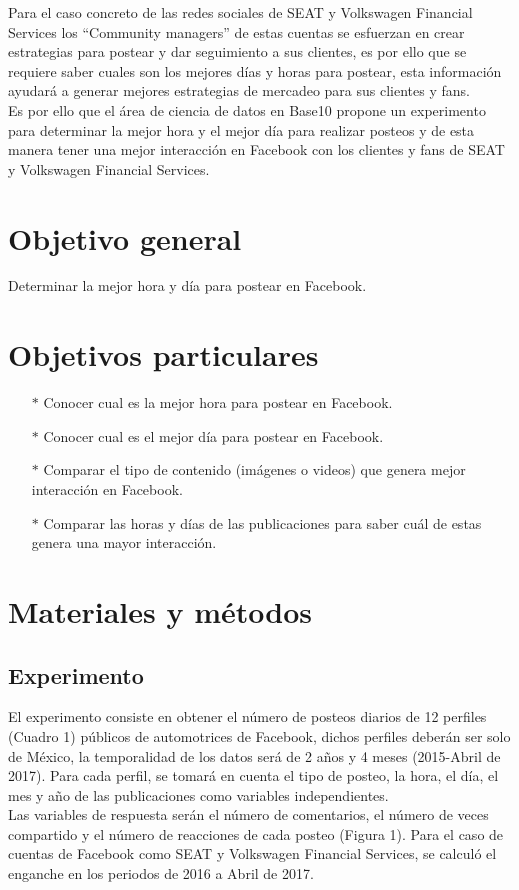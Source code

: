 \documentclass[a4paper,10pt]{article}
\begin{document}
Para el caso concreto de las redes sociales de SEAT y Volkswagen Financial Services
los ``Community managers'' de estas cuentas se esfuerzan en crear estrategias para postear y dar seguimiento a sus clientes,
es por ello que se requiere saber cuales son los mejores días y horas para postear, esta información ayudará a generar mejores estrategias
de mercadeo para sus clientes y fans.\\


Es por ello que el área de ciencia de datos en Base10 propone un experimento
para determinar la mejor hora y el mejor día para realizar posteos y de esta manera
tener una mejor interacción en Facebook con los clientes y fans de SEAT y Volkswagen Financial Services.


\section{Objetivo general}
Determinar la mejor hora y día para postear en Facebook.

\section{Objetivos particulares}
  \begin{itemize}
   \item[$*$] Conocer cual es la  mejor hora para postear en Facebook.
   \item[$*$] Conocer cual es el mejor día para postear en Facebook.
   \item[$*$] Comparar el tipo de contenido (imágenes o videos) que genera mejor interacción en Facebook.
   \item[$*$] Comparar las horas y días de las publicaciones para saber cuál de estas genera una  mayor interacción.
  \end{itemize}


\section{Materiales y métodos}
\subsection{Experimento}
El experimento consiste en obtener el número de posteos diarios de 12 perfiles (Cuadro 1)
públicos de automotrices de Facebook, dichos perfiles deberán ser solo de México, 
la temporalidad de los datos será de  2 años y 4 meses (2015-Abril de 2017).
Para cada perfil, se tomará en cuenta el tipo de posteo, la hora, el día, el mes y año de 
las publicaciones como variables independientes.\\
Las variables de respuesta serán el número de comentarios,
el número de veces compartido y el número de reacciones de cada posteo (Figura 1).
Para el caso de cuentas de Facebook como SEAT y Volkswagen Financial Services, se calculó
el enganche en los periodos de 2016 a Abril de 2017.
\end{document}
